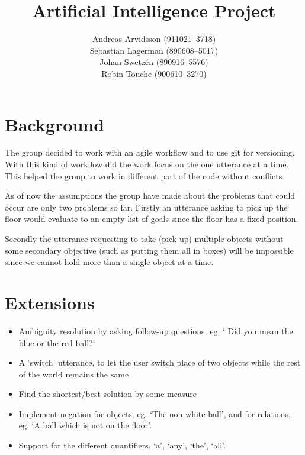 \documentclass[a4paper]{article}
\title{Artificial Intelligence Project}
\date{}
\author{Andreas Arvidsson (911021--3718) \\
        Sebastian Lagerman (890608--5017) \\
        Johan Swetz\'{e}n (890916--5576) \\
        Robin Touche (900610--3270)}
\begin{document}
\maketitle

\section*{Background}
The group decided to work with an agile workflow and to use git for versioning.
With this kind of workflow did the work focus on the one utterance at a time.
This helped the group to work in different part of the code without conflicts.

As of now the assumptions the group have made about the problems that could
occur are only two problems so far. Firstly an utterance asking to pick up the
floor would evaluate to an empty list of goals since the floor has a fixed
position.

Secondly the utterance requesting to take (pick up) multiple objects
without some secondary objective (such as putting them all in boxes) will be
impossible since we cannot hold more than a single object at a time.









\section*{Extensions}
\begin{itemize}
\item Ambiguity resolution by asking follow-up questions, eg. ` Did you mean the blue or the red ball?`
\item A `switch' utterance, to let the user switch place of two objects while the rest of the world remains the same
\item Find the shortest/best solution by some measure
\item Implement negation for objects, eg. `The non-white ball', and for relations, eg. `A ball which is not on the floor'.
\item Support for the different quantifiers, `a', `any', `the', `all'.
\end{itemize}
\newpage

\end{document}
